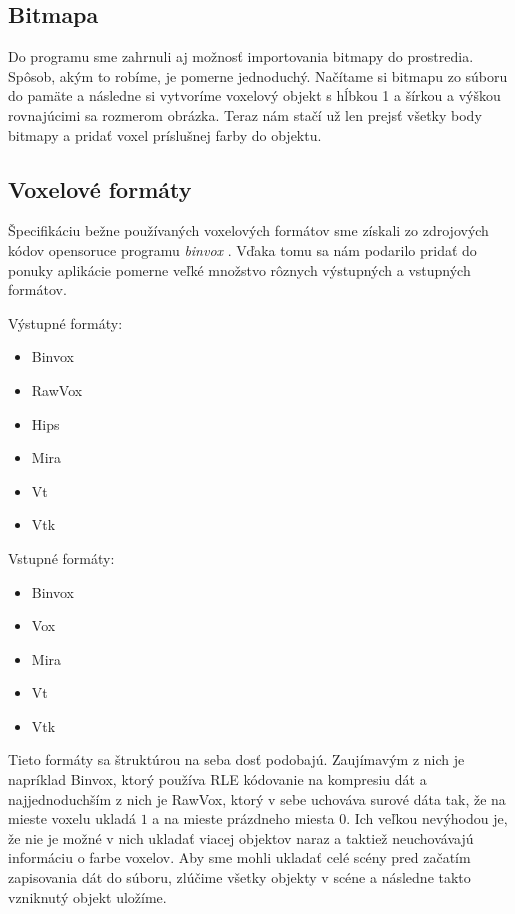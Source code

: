 \subsection{Bitmapa}
Do programu sme zahrnuli aj možnosť importovania bitmapy do prostredia. Spôsob, akým to robíme, je pomerne jednoduchý. Načítame si bitmapu zo súboru do pamäte a následne si vytvoríme voxelový objekt s hĺbkou 1 a šírkou a výškou rovnajúcimi sa rozmerom obrázka. Teraz nám stačí už len prejsť všetky body bitmapy a pridať voxel príslušnej farby do objektu. 

\subsection{Voxelové formáty}
Špecifikáciu bežne používaných voxelových formátov sme získali zo zdrojových kódov opensoruce programu \textit{binvox} \cite{binvox}. Vďaka tomu sa nám podarilo pridať do ponuky aplikácie pomerne veľké množstvo rôznych výstupných a vstupných formátov. 

\begin{multicols}{2}
Výstupné formáty:
\begin{itemize}
	\item Binvox
	\item RawVox
	\item Hips
	\item Mira
	\item Vt
	\item Vtk
\end{itemize}

Vstupné formáty:
\begin{itemize}
	\item Binvox
	\item Vox
	\item Mira
	\item Vt
	\item Vtk
\end{itemize}
\end{multicols}
Tieto formáty sa štruktúrou na seba dosť podobajú. Zaujímavým z nich je napríklad Binvox, ktorý používa RLE kódovanie na kompresiu dát a najjednoduchším z nich je RawVox, ktorý v sebe uchováva surové dáta tak, že na mieste voxelu ukladá $1$ a na mieste prázdneho miesta $0$.
Ich veľkou nevýhodou je, že nie je možné v nich ukladať viacej objektov naraz a taktiež neuchovávajú informáciu o farbe voxelov. Aby sme mohli ukladať celé scény pred začatím zapisovania dát do súboru, zlúčime všetky objekty v scéne a následne takto vzniknutý objekt uložíme.

